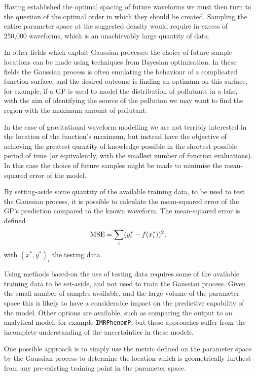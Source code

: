 \documentclass[a4paper]{article}
\begin{document}
Having established the optimal spacing of future waveforms we must
then turn to the question of the optimal order in which they should be
created. Sampling the entire parameter space at the suggested density
would require in excess of 250,000 waveforms, which is an unachievably
large quantity of data.

In other fields which exploit Gaussian processes the choice of future
sample locations can be made using techniques from Bayesian
optimisation. In these fields the Gaussian process is often emulating
the behaviour of a complicated function surface, and the desired
outcome is finding an optimum on this surface, for example, if a GP is
used to model the distribution of pollutants in a lake, with the aim
of identifying the source of the pollution we may want to find the
region with the maximum amount of pollutant. 

In the case of gravitational waveform modelling we are not terribly
interested in the location of the function's maximum, but instead have
the objective of achieving the greatest quantity of knowledge possible
in the shortest possible period of time (or equivalently, with the
smallest number of function evaluations). In this case the choice of
future samples might be made to minimise the mean-squared error of the
model.

By setting-aside some quantity of the available training data, to be
used to test the Gaussian process, it is possible to calculate the
mean-squared error of the GP's prediction compared to the known
waveform. The mean-squared error is defined
\begin{equation}
  \label{eq:mse}
  {\rm MSE} = \sum_i (y_i^* - f(x_i^*))^2,
\end{equation}
with $(x^*, y^*)_i$ the testing data.

Using methods based-on the use of testing data requires some of the
available training data to be set-aside, and not used to train the
Gaussian process. Given the small number of samples available, and the
large volume of the parameter space this is likely to have a
considerable impact on the predictive capability of the model. Other
options are available, such as comparing the output to an analytical
model, for example \texttt{IMRPhenomP}, but these approaches suffer
from the incomplete understanding of the uncertainties in these
models.

One possible approach is to simply use the metric defined on the
parameter space by the Gaussian process to determine the location
which is geometrically furthest from any pre-existing training point
in the parameter space.
\end{document}
